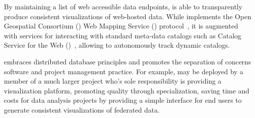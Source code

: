 
By maintaining a list of web accessible data endpoints, \sciwms{} is
able to transparently produce consistent visualizations of web-hosted
data. While \sciwms{} implements the Open Geospatial Consortium (\ogc{})
Web Mapping Service (\wms{}) protocol~\cite{wms14}, it is augmented
with services for interacting with standard meta-data catalogs such as
Catalog Service for the Web (\csw{})~\cite{csw14}, allowing \sciwms{}
to autonomously track dynamic catalogs. 

\sciwms{} embraces distributed database principles and promotes the
separation of concerns software and project management practice. For
example, \sciwms{} may be deployed by a member of a much larger
project who's sole responsibility is providing a visualization
platform, promoting quality through specialization, saving time and
costs for data analysis projects by providing a simple interface for
end users to generate consistent visualizations of federated data.
